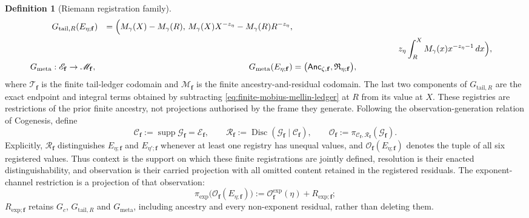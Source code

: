 \documentclass[11pt,a4paper]{article}
\theoremstyle{definition}
\newtheorem{definition}[theorem]{Definition}
\newcommand{\Residual}{\mathfrak{R}}
\newcommand{\Cctx}{\mathcal{C}}
\newcommand{\Rres}{\mathcal{R}}
\begin{document}
\begin{definition}[Riemann registration family]
\[\begin{aligned}
  &G_{\mathrm{tail},R}(E_{\eta;\mathbf f})
  &=
  \Bigl(
    M_\gamma(X)-M_\gamma(R),\,
    M_\gamma(X)X^{-z_\eta}-M_\gamma(R)R^{-z_\eta},\\
  &&&\hspace{4.4cm}
    z_\eta\int_R^X M_\gamma(x)x^{-z_\eta-1}\,dx
  \Bigr),\\
  G_{\mathrm{meta}}&:\mathscr E_{\mathbf f}\to\mathscr M_{\mathbf f},
  &G_{\mathrm{meta}}(E_{\eta;\mathbf f})
  &=
  \bigl(\mathsf{Anc}_{\zeta,\mathbf f},\Residual_{\eta;\mathbf f}\bigr),
  \end{aligned}
\]
where $\mathscr T_{\mathbf f}$ is the finite tail-ledger codomain and
$\mathscr M_{\mathbf f}$ is the finite ancestry-and-residual codomain. The
last two components of $G_{\mathrm{tail},R}$ are the exact endpoint and
integral terms obtained by subtracting
\cref{eq:finite-mobius-mellin-ledger} at $R$ from its value at $X$. These registries
are restrictions of the prior finite ancestry, not projections authorised by
the frame they generate. Following the observation-generation relation of
Cogenesis, define
\begin{equation}
\label{eq:riemann-context-resolution-generation}
  \Cctx_{\mathbf f}
  :=
  \operatorname{supp}\mathcal G_{\mathbf f}
  =\mathscr E_{\mathbf f},
  \qquad
  \Rres_{\mathbf f}
  :=
  \operatorname{Disc}\!\left(
    \mathcal G_{\mathbf f}\mid\Cctx_{\mathbf f}
  \right),
  \qquad
  \mathcal O_{\mathbf f}
  :=
  \pi_{\Cctx_{\mathbf f},\Rres_{\mathbf f}}
  (\mathcal G_{\mathbf f}).
\end{equation}
Explicitly, $\Rres_{\mathbf f}$ distinguishes
$E_{\eta;\mathbf f}$ and $E_{\eta';\mathbf f}$ whenever at least one registry
has unequal values, and
$\mathcal O_{\mathbf f}(E_{\eta;\mathbf f})$ denotes the tuple of all six
registered values.
Thus context is the support on which these finite registrations are jointly
defined, resolution is their enacted distinguishability, and observation is
their carried projection with all omitted content retained in the registered
residuals.
The exponent-channel restriction is a projection of that observation:
\[
  \pi_{\mathrm{exp}}
  \bigl(\mathcal O_{\mathbf f}(E_{\eta;\mathbf f})\bigr)
  :=
  \mathcal O_{\mathbf f}^{\mathrm{exp}}(\eta)
  +R_{\mathrm{exp};\mathbf f};
\]
$R_{\mathrm{exp};\mathbf f}$ retains $G_c$, $G_{\mathrm{tail},R}$ and
$G_{\mathrm{meta}}$, including ancestry and every non-exponent residual,
rather than deleting them.
\end{definition}
\end{document}
